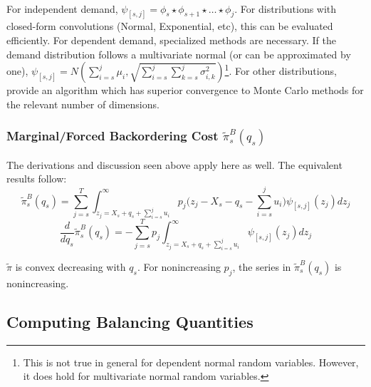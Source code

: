 \documentclass[12pt]{article}
\begin{document}
\\
For independent demand, $\psi_{[s,j]} = \phi_s \star \phi_{s+1} \star \dots \star \phi_j$.
For distributions with closed-form convolutions (Normal, Exponential, etc), this can be evaluated efficiently. For dependent demand, specialized methods are necessary. If the demand distribution follows a multivariate normal (or can be approximated by one), $\psi_{[s,j]} = N(\sum_{i=s}^j \mu_i, \sqrt{\sum_{i=s}^{j} \sum_{k=s}^j \sigma_{i,k}^2})$\footnote{This is not true in general for dependent normal random variables. However, it does hold for multivariate normal random variables.}. For other distributions,  \cite{arbenz:2011} provide an algorithm which has superior convergence to Monte Carlo methods for the relevant number of dimensions.

\subsubsection*{Marginal/Forced Backordering Cost $\tilde{\pi}_s^B(q_s)$}

The derivations and discussion seen above apply here as well. The equivalent results follow:
\begin{equation}
	\tilde{\pi}_s^B(q_s) =  \sum_{j=s}^T \int_{z_j= X_s + q_s + \sum_{i=s}^j u_i }^{\infty} p_j\bigg( z_j - X_s - q_s - \sum_{i=s}^j u_i \bigg)  \psi_{[s,j]}(z_j) dz_j
\end{equation}
\begin{equation}
	\frac{d}{d q_s} \tilde{\pi}_s^B(q_s) = - \sum_{j=s}^T p_j \int_{z_j=X_s + q_s + \sum_{i=s}^j u_i }^{\infty}  \psi_{[s,j]}(z_j) dz_j 
\end{equation}

$\tilde{\pi}$ is convex decreasing with $q_s$. For nonincreasing $p_j$, the series in $\tilde{\pi}_s^B(q_s)$ is nonincreasing. 

\subsection{Computing Balancing Quantities}
\end{document}
